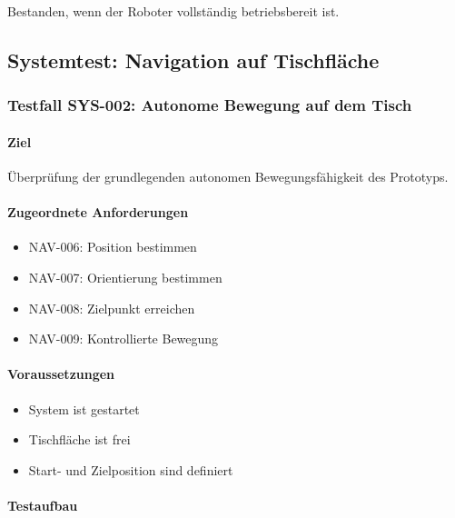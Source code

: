 Bestanden, wenn der Roboter vollständig betriebsbereit ist.

\subsection{Systemtest: Navigation auf
Tischfläche}\label{systemtest-navigation-auf-tischfluxe4che}

\subsubsection{Testfall SYS-002: Autonome Bewegung auf dem
Tisch}\label{testfall-sys-002-autonome-bewegung-auf-dem-tisch}

\paragraph{Ziel}\label{ziel-25}

Überprüfung der grundlegenden autonomen Bewegungsfähigkeit des
Prototyps.

\paragraph{Zugeordnete
Anforderungen}\label{zugeordnete-anforderungen-25}

\begin{itemize}
\tightlist
\item
  NAV-006: Position bestimmen
\item
  NAV-007: Orientierung bestimmen
\item
  NAV-008: Zielpunkt erreichen
\item
  NAV-009: Kontrollierte Bewegung
\end{itemize}

\paragraph{Voraussetzungen}\label{voraussetzungen-24}

\begin{itemize}
\tightlist
\item
  System ist gestartet
\item
  Tischfläche ist frei
\item
  Start- und Zielposition sind definiert
\end{itemize}

\paragraph{Testaufbau}\label{testaufbau-1}


